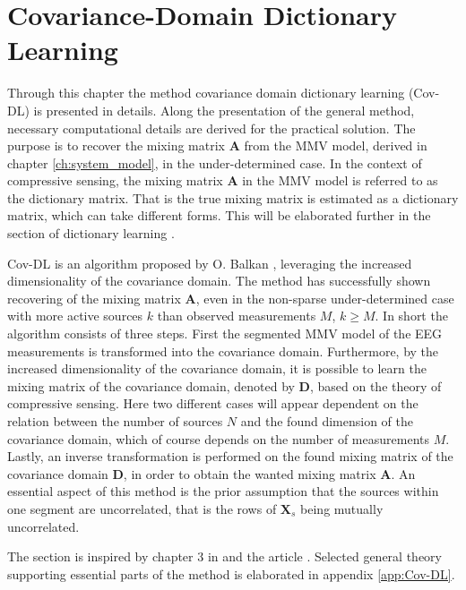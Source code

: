 \chapter{Covariance-Domain Dictionary Learning}\label{ch:Cov-DL}
Through this chapter the method covariance domain dictionary learning (Cov-DL) is presented in details. 
Along the presentation of the general method, necessary computational details are derived for the practical solution.
The purpose is to recover the mixing matrix $\mathbf{A}$ from the MMV model, derived in chapter \ref{ch:system_model}, in the under-determined case. 
In the context of compressive sensing, the mixing matrix $\mathbf{A}$ in the MMV model is referred to as the dictionary matrix. 
That is the true mixing matrix is estimated as a dictionary matrix, which can take different forms. 
This will be elaborated further in the section of dictionary learning .

Cov-DL is an algorithm proposed by O. Balkan \cite{Balkan2015}, leveraging the increased dimensionality of the covariance domain. 
The method has successfully shown recovering of the mixing matrix $\mathbf{A}$, even in the non-sparse under-determined case with more active sources $k$ than observed measurements $M$, $k \geq M$. 
In short the algorithm consists of three steps. 
First the segmented MMV model of the EEG measurements is transformed into the covariance domain. 
Furthermore, by the increased dimensionality of the covariance domain, it is possible to learn the mixing matrix of the covariance domain, denoted by $\mathbf{D}$, based on the theory of compressive sensing. 
Here two different cases will appear dependent on the relation between the number of sources $N$ and the found dimension of the covariance domain, which of course depends on the number of measurements $M$. 
Lastly, an inverse transformation is performed on the found mixing matrix of the covariance domain $\mathbf{D}$, in order to obtain the wanted mixing matrix $\mathbf{A}$. 
An essential aspect of this method is the prior assumption that the sources within one segment are uncorrelated, that is the rows of $\mathbf{X}_s$ being mutually uncorrelated. 

The section is inspired by chapter 3 in \cite{phd2015} and the article \cite{Balkan2015}. 
Selected general theory supporting essential parts of the method is elaborated in appendix \ref{app:Cov-DL}.


%